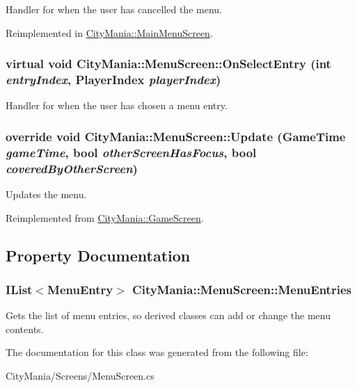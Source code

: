 Handler for when the user has cancelled the menu. 

Reimplemented in \hyperlink{classCityMania_1_1MainMenuScreen_a46244ba46d101dafbdad93e8a8cb00a2}{CityMania::MainMenuScreen}.\hypertarget{classCityMania_1_1MenuScreen_a43061349ad3024e285e418cb1716e887}{
\subsubsection[{OnSelectEntry}]{\setlength{\rightskip}{0pt plus 5cm}virtual void CityMania::MenuScreen::OnSelectEntry (int {\em entryIndex}, \/  PlayerIndex {\em playerIndex})}}
\label{classCityMania_1_1MenuScreen_a43061349ad3024e285e418cb1716e887}


Handler for when the user has chosen a menu entry. \hypertarget{classCityMania_1_1MenuScreen_af5c5b89dcc99c92d99ec3e0924e7bea1}{
\subsubsection[{Update}]{\setlength{\rightskip}{0pt plus 5cm}override void CityMania::MenuScreen::Update (GameTime {\em gameTime}, \/  bool {\em otherScreenHasFocus}, \/  bool {\em coveredByOtherScreen})}}
\label{classCityMania_1_1MenuScreen_af5c5b89dcc99c92d99ec3e0924e7bea1}


Updates the menu. 

Reimplemented from \hyperlink{classCityMania_1_1GameScreen_a7f0d5b33eca521dc7fcd89eec337ccf9}{CityMania::GameScreen}.

\subsection{Property Documentation}
\hypertarget{classCityMania_1_1MenuScreen_a62f17cbe5d646e7ba2e9d8b129069e22}{
\subsubsection[{MenuEntries}]{\setlength{\rightskip}{0pt plus 5cm}IList$<${\bf MenuEntry}$>$ CityMania::MenuScreen::MenuEntries}}
\label{classCityMania_1_1MenuScreen_a62f17cbe5d646e7ba2e9d8b129069e22}


Gets the list of menu entries, so derived classes can add or change the menu contents. 

The documentation for this class was generated from the following file:\begin{DoxyCompactItemize}
\item 
CityMania/Screens/MenuScreen.cs\end{DoxyCompactItemize}
